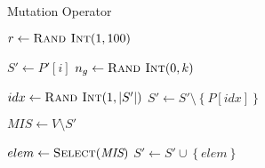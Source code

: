 \begin{algorithm}
  \caption{Mutation Operator}\label{alg:GENETIKUS_ALGORITMUS:MUTACIO}
  \begin{algorithmic}[1]
    \State $r \leftarrow \Call{Rand Int}{1, 100}$

    \State $S' \leftarrow P'[i]$
    \State $n_{g} \leftarrow \Call{Rand Int}{0, k}$

    \State $idx \leftarrow \Call{Rand Int}{1, \abs{S'}}$
    \State $S' \leftarrow S' \setminus \left\{ P\left[ idx \right] \right\}$
    \EndFor

    \State $\textit{MIS} \leftarrow V \setminus S'$

    \State $elem \leftarrow \Call{Select}{\textit{MIS}}$
    \State $S' \leftarrow S' \cup \left\{ elem \right\}$
    \EndWhile
    \EndIf
    \EndFor
    \EndProcedure
  \end{algorithmic}
\end{algorithm}
